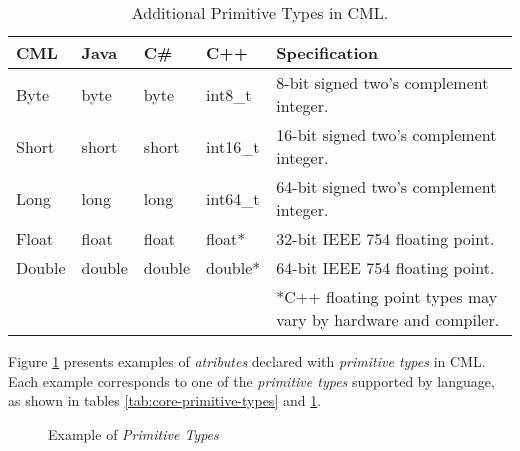 \begin{table}[h]
\centering
\begin{tabular}
{l l l l p{7cm} }
\hline
CML & Java & C\# & C++ & Specification \\
\hline
Byte & byte & byte & int8\_t & 8-bit signed two's complement integer. \\
Short & short & short & int16\_t & 16-bit signed two's complement integer. \\
Long & long & long & int64\_t & 64-bit signed two's complement integer. \\
Float & float & float & float* & 32-bit IEEE 754 floating point. \\
Double & double & double & double* & 64-bit IEEE 754 floating point. \\
& & & & *C++ floating point types may vary by hardware and compiler.
\end{tabular}
\caption{Additional Primitive Types in CML.}
\label{tab:additional-primitive-types}
\end{table}

\begin{examples}
Figure \ref{fig:ex:primitive-types} presents examples
of \emph{atributes} declared with \emph{primitive types} in CML.
Each example corresponds to one of the \emph{primitive types} 
supported by language,
as shown in tables \ref{tab:core-primitive-types} and \ref{tab:additional-primitive-types}.
\end{examples}

\begin{figure}
\verbatimfont{\small}

\caption{Example of \emph{Primitive Types}}
\label{fig:ex:primitive-types}
\end{figure}
